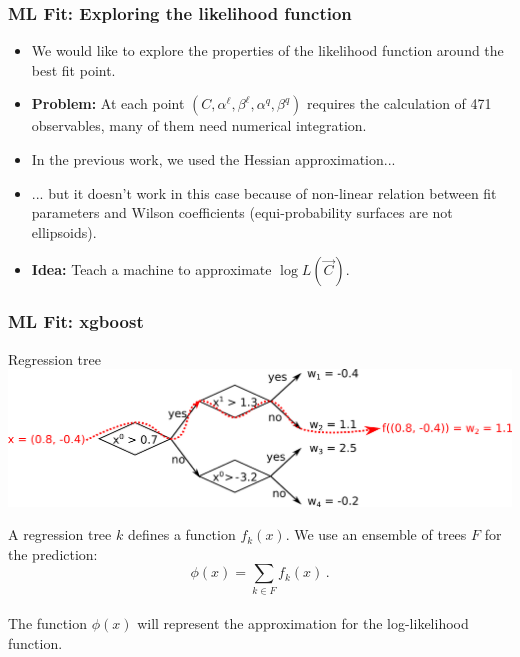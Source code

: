 \documentclass[mathserif, 10pt, dvipsnames]{beamer}
\begin{document}
\begin{frame}\frametitle{ML Fit: Exploring the likelihood function}

    \begin{itemize}
        \item We would like to explore the properties of the likelihood function around the best fit point.
        \item {\bf Problem:} At each point $(C, \alpha^\ell, \beta^\ell, \alpha^q, \beta^q)$ requires the calculation of 471 observables, many of them need numerical integration.
        \item In the previous work, we used the Hessian approximation...

        \item ... but it doesn't work in this case because of non-linear relation between fit parameters and Wilson coefficients (equi-probability surfaces are not ellipsoids).
        \item {\bf Idea:} Teach a machine to approximate $\log L(\vec{C})$.
    \end{itemize}

\end{frame}

\begin{frame}\frametitle{ML Fit: xgboost}

    Regression tree
    \includegraphics[width=\textwidth]{figures/regtree.png}

\vspace{1.0cm}

A regression tree $k$ defines a function $f_k(x)$. We use an
ensemble of trees $F$ for the prediction: $$\phi(x) = \sum_{k\in F}
    f_k(x)\,.$$\\
The function $\phi(x)$ will represent the approximation for the log-likelihood
function.
\end{frame}
\end{document}
